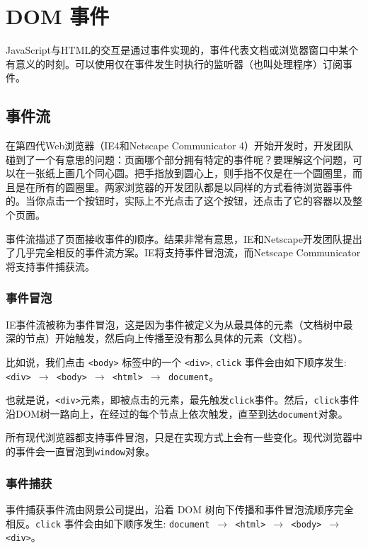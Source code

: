 \section{DOM 事件}

JavaScript与HTML的交互是通过事件实现的，事件代表文档或浏览器窗口中某个有意义的时刻。可以使用仅在事件发生时执行的监听器（也叫处理程序）订阅事件。

\subsection{事件流}

在第四代Web浏览器（IE4和Netscape Communicator 4）开始开发时，开发团队碰到了一个有意思的问题：页面哪个部分拥有特定的事件呢？要理解这个问题，可以在一张纸上画几个同心圆。把手指放到圆心上，则手指不仅是在一个圆圈里，而且是在所有的圆圈里。两家浏览器的开发团队都是以同样的方式看待浏览器事件的。当你点击一个按钮时，实际上不光点击了这个按钮，还点击了它的容器以及整个页面。

事件流描述了页面接收事件的顺序。结果非常有意思，IE和Netscape开发团队提出了几乎完全相反的事件流方案。IE将支持事件冒泡流，而Netscape Communicator将支持事件捕获流。

\subsubsection*{事件冒泡}

IE事件流被称为事件冒泡，这是因为事件被定义为从最具体的元素（文档树中最深的节点）开始触发，然后向上传播至没有那么具体的元素（文档）。

比如说，我们点击 \texttt{<body>} 标签中的一个 \texttt{<div>}, \texttt{click} 事件会由如下顺序发生: \texttt{<div> $\rightarrow$ <body> $\rightarrow$ <html> $\rightarrow$ document}。

也就是说，\texttt{<div>}元素，即被点击的元素，最先触发\texttt{click}事件。然后，\texttt{click}事件沿DOM树一路向上，在经过的每个节点上依次触发，直至到达\texttt{document}对象。

所有现代浏览器都支持事件冒泡，只是在实现方式上会有一些变化。现代浏览器中的事件会一直冒泡到\texttt{window}对象。

\subsubsection*{事件捕获}

事件捕获事件流由网景公司提出，沿着 DOM 树向下传播和事件冒泡流顺序完全相反。\texttt{click} 事件会由如下顺序发生: \texttt{document $\rightarrow$ <html> $\rightarrow$ <body> $\rightarrow$ <div>}。

